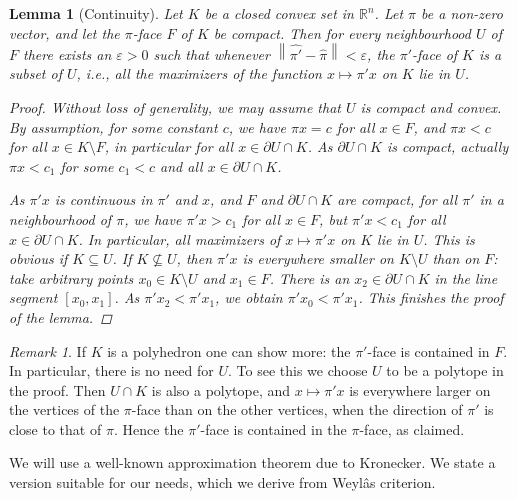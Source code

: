 \documentclass[11pt]{article}
\newtheorem{lem}[thm]{Lemma}
\theoremstyle{remark}
\newtheorem{rem}{Remark}
\begin{document}
\begin{lem}[Continuity]
  \label{lem:nearby-dir}
  Let \(K\) be a closed convex set in \(\mathbb{R}^{n}\).
  Let \(\pi\) be a non-zero vector,
  and let the \(\pi\)-face \(F\) of \(K\) be compact.
  Then for every neighbourhood \(U\) of \(F\)
  there exists an \(\varepsilon > 0\) such that
  whenever
  \({\left\lVert{{\widehat{{\pi'}}} - {\widehat{{\pi}}}}\right\rVert}
  < \varepsilon\),
  the \(\pi'\)-face of \(K\) is a subset of \(U\),
  i.e.,
  all the maximizers of
  the function \(x \mapsto \pi' x\) on \(K\) lie in \(U\).
\begin{proof}
Without loss of generality,
we may assume that \(U\) is compact and convex.
By assumption, for some constant \(c\),
we have \(\pi x = c\) for all \(x \in F\),
and \(\pi x < c\) for all \(x \in K \setminus F\),
in particular for all \(x \in \partial U \cap K\).
As \(\partial U \cap K\) is compact, actually
\(\pi x < c_{1}\) for some \(c_{1} < c\)
and all \(x \in \partial U \cap K\).

As \(\pi' x\) is continuous in \(\pi'\) and \(x\),
and \(F\) and \(\partial U \cap K\)
are compact,
for all \(\pi'\) in a neighbourhood of \(\pi\),
we have \(\pi' x > c_{1}\) for all \(x \in F\),
but  \(\pi' x < c_{1}\) for all \(x \in \partial U \cap K\).
In particular,
all maximizers of \(x \mapsto \pi' x\) on \(K\) lie in \(U\).
This is obvious if \(K \subseteq U\).
If \(K \nsubseteq U\),
then \(\pi' x\) is everywhere smaller on \(K \setminus U\)
than on \(F\):
take arbitrary points \(x_{0} \in K \setminus U\)
and \(x_{1} \in F\).
There is an \(x_{2} \in \partial U \cap K\)
in the line segment \([x_{0}, x_{1}]\).
As \(\pi' x_{2} < \pi' x_{1}\),
we obtain \(\pi' x_{0} < \pi' x_{1}\).
This finishes the proof of the lemma.
\end{proof}
\end{lem}

\begin{rem}
  If \(K\) is a polyhedron one can show more:
  the \(\pi'\)-face is contained in \(F\).
  In
  particular, there is no need for \(U\). To see this we choose \(U\)
  to be a polytope in the proof.
Then \(U \cap K\) is also a polytope,
and \(x \mapsto \pi' x\) is everywhere larger
on the vertices
of the \(\pi\)-face than on the other vertices,
when the direction of \(\pi'\) is close to that of \(\pi\).
Hence the \(\pi'\)-face is contained in the \(\pi\)-face,
as claimed.

\end{rem}

We will use a well-known approximation theorem due to Kronecker.
We state a version suitable for our needs,
which we derive from Weylâs criterion.
\end{document}

